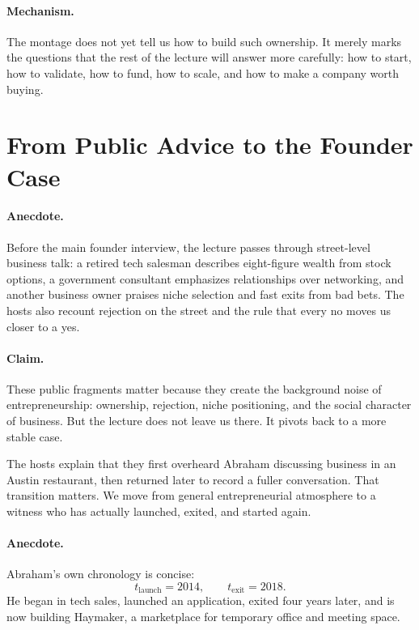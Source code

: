 \paragraph{Mechanism.} The montage does not yet tell us how to build such ownership. It merely marks the questions that the rest of the lecture will answer more carefully: how to start, how to validate, how to fund, how to scale, and how to make a company worth buying.

\section{From Public Advice to the Founder Case}

\paragraph{Anecdote.} Before the main founder interview, the lecture passes through street-level business talk: a retired tech salesman describes eight-figure wealth from stock options, a government consultant emphasizes relationships over networking, and another business owner praises niche selection and fast exits from bad bets. The hosts also recount rejection on the street and the rule that every no moves us closer to a yes.

\paragraph{Claim.} These public fragments matter because they create the background noise of entrepreneurship: ownership, rejection, niche positioning, and the social character of business. But the lecture does not leave us there. It pivots back to a more stable case.

The hosts explain that they first overheard Abraham discussing business in an Austin restaurant, then returned later to record a fuller conversation. That transition matters. We move from general entrepreneurial atmosphere to a witness who has actually launched, exited, and started again.

\paragraph{Anecdote.} Abraham's own chronology is concise:
\begin{equation}
t_{\text{launch}} = 2014,
\qquad
t_{\text{exit}} = 2018.
\end{equation}
He began in tech sales, launched an application, exited four years later, and is now building Haymaker, a marketplace for temporary office and meeting space.

